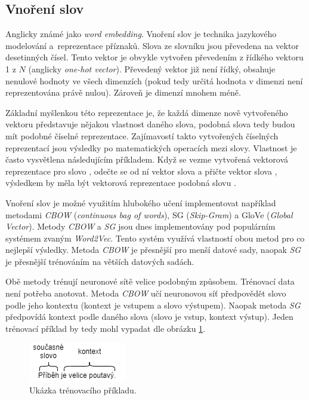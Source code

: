 \subsection{Vnoření slov}
Anglicky známé jako \emph{word embedding}. Vnoření slov je technika jazykového modelování a~reprezentace příznaků. Slova ze slovníku jsou převedena na vektor desetinných čísel. Tento vektor je obvykle vytvořen převedením z řídkého vektoru 1 z $N$ (anglicky \emph{one-hot vector}). Převedený vektor již není řídký, obsahuje nenulové hodnoty ve všech dimenzích (pokud tedy určitá hodnota v dimenzi není reprezentována právě nulou). Zároveň je dimenzí mnohem méně. 

Základní myšlenkou této reprezentace je, že každá dimenze nově vytvořeného vektoru představuje nějakou vlastnost daného slova, podobná slova tedy budou mít podobné číselné reprezentace. Zajímavostí takto vytvořených číselných reprezentací jsou výsledky po matematických operacích mezi slovy. Vlastnost je často vysvětlena následujícím příkladem. Když se vezme vytvořená vektorová reprezentace pro slovo , odečte se od ní vektor slova  a přičte vektor slova , výsledkem by měla být vektorová reprezentace podobná slovu .


Vnoření slov je možné využitím hlubokého učení implementovat například metodami \emph{CBOW} \cite{cbow} (\emph{continuous bag of words}), SG \cite{sg} (\emph{Skip-Gram}) a GloVe (\emph{Global Vector}). Metody \emph{CBOW} a \emph{SG} jsou dnes implementovány pod populárním systémem zvaným \emph{Word2Vec}. Tento systém využívá vlastností obou metod pro co nejlepší výsledky. Metoda \emph{CBOW} je přesnější pro menší datové sady, naopak \emph{SG} je přesnější trénováním na větších datových sadách.

Obě metody trénují neuronové sítě velice podobným způsobem. Trénovací data není potřeba anotovat. Metoda \emph{CBOW} učí neuronovou síť předpovědět slovo podle jeho kontextu (kontext je vstupem a slovo výstupem). Naopak metoda \emph{SG} předpovídá kontext podle daného slova (slovo je vstup, kontext výstup). Jeden trénovací příklad by tedy mohl vypadat dle obrázku \ref{trainexample}.

\begin{figure}[!htb]
\centering
\label{trainexample}
\includegraphics[width=\textwidth/4]{cbow_sg_example.png}
\caption{Ukázka trénovacího příkladu.}
\end{figure}




